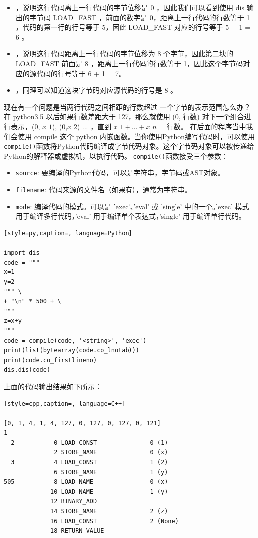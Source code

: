 \begin{itemize}
\item [0, 1]，说明这行代码离上一行代码的字节位移是 0 ，因此我们可以看到使用 dis 输出的字节码 LOAD\_FAST ，前面的数字是 0，距离上一行代码的行数等于 1 ，代码的第一行的行号等于 5，因此 LOAD\_FAST 对应的行号等于 5 + 1 = 6 。
\item [8, 1]，说明这行代码距离上一行代码的字节位移为 8 个字节，因此第二块的 LOAD\_FAST 前面是 8 ，距离上一行代码的行数等于 1，因此这个字节码对应的源代码的行号等于 6 + 1 = 7。
\item [8, 1]，同理可以知道这块字节码对应源代码的行号是 8 。
\end{itemize}
现在有一个问题是当两行代码之间相距的行数超过 一个字节的表示范围怎么办？在 python3.5 以后如果行数差距大于 127，那么就使用 (0, 行数) 对下一个组合进行表示，(0, $x\_1$), (0,$ x\_2$) ... ，直到 $x\_1 + ... + x\_n$ = 行数。
在后面的程序当中我们会使用 compile 这个 python 内嵌函数。当你使用Python编写代码时，可以使用\verb|compile()|函数将Python代码编译成字节代码对象。这个字节码对象可以被传递给Python的解释器或虚拟机，以执行代码。
\verb|compile()|函数接受三个参数：
\begin{itemize}
\item \verb|source|: 要编译的Python代码，可以是字符串，字节码或AST对象。
\item \verb|filename|: 代码来源的文件名（如果有），通常为字符串。
\item \verb|mode|: 编译代码的模式。可以是 'exec'、'eval' 或 'single' 中的一个。'exec' 模式用于编译多行代码，'eval' 用于编译单个表达式，'single' 用于编译单行代码。
\end{itemize}
\begin{lstlisting}[style=py,caption=, language=Python]

import dis
code = """
x=1
y=2
""" \
+ "\n" * 500 + \
"""
z=x+y
"""
code = compile(code, '<string>', 'exec')
print(list(bytearray(code.co_lnotab)))
print(code.co_firstlineno)
dis.dis(code)
\end{lstlisting}
上面的代码输出结果如下所示：
\begin{lstlisting}[style=cpp,caption=, language=C++]

[0, 1, 4, 1, 4, 127, 0, 127, 0, 127, 0, 121]
1
  2           0 LOAD_CONST               0 (1)
              2 STORE_NAME               0 (x)
  3           4 LOAD_CONST               1 (2)
              6 STORE_NAME               1 (y)
505           8 LOAD_NAME                0 (x)
             10 LOAD_NAME                1 (y)
             12 BINARY_ADD
             14 STORE_NAME               2 (z)
             16 LOAD_CONST               2 (None)
             18 RETURN_VALUE
\end{lstlisting}
